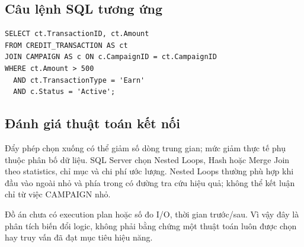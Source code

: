 \subsection{Câu lệnh SQL tương ứng}
\begin{lstlisting}[style=sqlstyle]
SELECT ct.TransactionID, ct.Amount
FROM CREDIT_TRANSACTION AS ct
JOIN CAMPAIGN AS c ON c.CampaignID = ct.CampaignID
WHERE ct.Amount > 500
  AND ct.TransactionType = 'Earn'
  AND c.Status = 'Active';
\end{lstlisting}

\subsection{Đánh giá thuật toán kết nối}
Đẩy phép chọn xuống có thể giảm số dòng trung gian; mức giảm thực tế phụ thuộc phân bố dữ liệu. SQL Server chọn Nested Loops, Hash hoặc Merge Join theo statistics, chỉ mục và chi phí ước lượng. Nested Loops thường phù hợp khi đầu vào ngoài nhỏ và phía trong có đường tra cứu hiệu quả; không thể kết luận chỉ từ việc CAMPAIGN nhỏ.

Đồ án chưa có execution plan hoặc số đo I/O, thời gian trước/sau. Vì vậy đây là phân tích biến đổi logic, không phải bằng chứng một thuật toán luôn được chọn hay truy vấn đã đạt mục tiêu hiệu năng.
